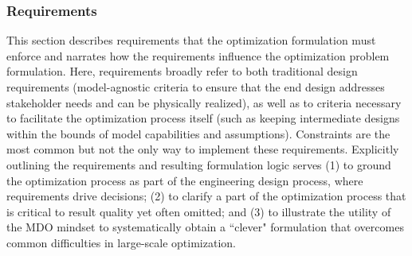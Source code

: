 
\subsubsection{Requirements}\label{sec:requirements}
This section describes requirements that the optimization formulation must enforce and narrates how the requirements influence the optimization problem formulation.
Here, requirements broadly refer to both traditional design requirements (model-agnostic criteria to ensure that the end design addresses stakeholder needs and can be physically realized), as well as to criteria necessary to facilitate the optimization process itself (such as keeping intermediate designs within the bounds of model capabilities and assumptions).
Constraints are the most common but not the only way to implement these requirements.
Explicitly outlining the requirements and resulting formulation logic serves (1) to ground the optimization process as part of the engineering design process, where requirements drive decisions; 
(2) to clarify a part of the optimization process that is critical to result quality yet often omitted; and (3) to illustrate the utility of the MDO mindset to systematically obtain a ``clever" formulation that overcomes common difficulties in large-scale optimization. 

